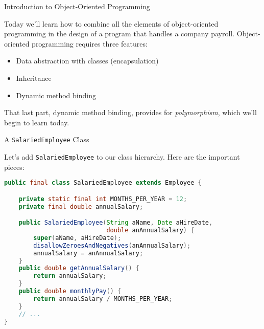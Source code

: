 \documentclass{beamer}
\author[Chris Simpkins] 
{Christopher Simpkins \\\texttt{chris.simpkins@gatech.edu}}
\institute[Georgia Tech] %
\date[CS 1331]{}
\title[\course] %
{\lesson}
\subtitle{}
\begin{document}
\begin{frame}
  \titlepage
\end{frame}

\begin{frame}[fragile]{Introduction to Object-Oriented Programming}


Today we'll learn how to combine all the elements of object-oriented programming in the design of a program that handles a company payroll.  Object-oriented programming requires three features:
\begin{itemize}
\item Data abstraction with classes (encapsulation)
\item Inheritance
\item Dynamic method binding
\end{itemize}

That last part, dynamic method binding, provides for {\it polymorphism}, which we'll begin to learn today.

\end{frame}

\begin{frame}[fragile]{A {\tt SalariedEmployee} Class}


Let's add {\tt SalariedEmployee} to our class hierarchy.  Here are the important pieces:
\begin{lstlisting}[language=Java]
public final class SalariedEmployee extends Employee {

    private static final int MONTHS_PER_YEAR = 12;
    private final double annualSalary;

    public SalariedEmployee(String aName, Date aHireDate,
                            double anAnnualSalary) {
        super(aName, aHireDate);
        disallowZeroesAndNegatives(anAnnualSalary);
        annualSalary = anAnnualSalary;
    }
    public double getAnnualSalary() {
        return annualSalary;
    }
    public double monthlyPay() {
        return annualSalary / MONTHS_PER_YEAR;
    }
    // ...
}
\end{lstlisting}

\end{frame}
\end{document}
